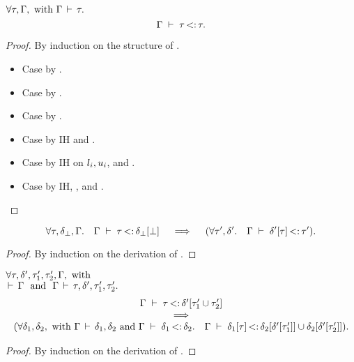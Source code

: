\begin{theorem}\label{thm:sub-ty-refl}
    $\forall \tau, \Gamma, \text{ with } \Gamma\,\vdash\,\tau.$
    \[\Gamma\;\vdash\;\tau \operatorname{<:} \tau.\]
\end{theorem}
\begin{proof}
    By induction on the structure of \ty.
    \begin{itemize}
        \item Case \tyany by .
        \item Case \tybot by .
        \item Case \vany by .
        \item Case  by IH and .
        \item Case \tyinv{} by IH on
            $l_i, u_i$, and .
        \item Case  by IH, ,
            and .
    \end{itemize}
\end{proof}

\begin{lemma}\label{lem:sub-of-bot}
    \[
    \forall \tau, \delta_{\bot}, \Gamma.\quad 
    \Gamma\;\vdash\;\tau \operatorname{<:} \delta_{\bot}[\bot]
    \quad\implies\quad
    (\forall \tau', \delta'.\quad \Gamma\;\vdash\;\delta'[\tau] \operatorname{<:} \tau').
    \]
\end{lemma}
\begin{proof}
    By induction on the derivation of 
    \subtydflt{\ty}{\plug{\dctx_{\tybot}}\tybot}.
\end{proof}

\begin{lemma}%
\label{lem:sub-inner-union-right}
    $\forall \tau, \delta', \tau'_1, \tau'_2, \Gamma, \text{ with }$\\
    $\tyvld{}{\AEnv}\ \text{ and }\ \tyvlddflt{\ty, \dctx', \ty'_1, \ty'_2}.$
    \[
        \begin{array}{ccc}
        \Gamma\;\vdash\;\tau \operatorname{<:} \delta'[\tau'_1 \cup \tau'_2]\\
        \quad\implies\quad\\
        (\forall \delta_1, \delta_2, \text{ with }
        \Gamma\,\vdash\,\delta_1, \delta_2 \text{ and }
        \Gamma\;\vdash\;\delta_1 \operatorname{<:} \delta_2.\quad
        \Gamma\;\vdash\;\delta_1[\tau] \operatorname{<:} \delta_2[\delta'[\tau'_1]] \cup \delta_2[\delta'[\tau'_2]]
            ).
        \end{array}
    \]
\end{lemma}
\begin{proof}
    By induction on the derivation of
    .
\end{proof}

